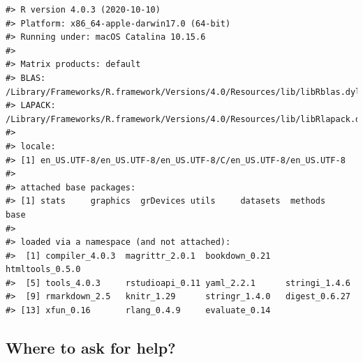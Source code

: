 \documentclass[
]{book}
\begin{document}
\begin{verbatim}
#> R version 4.0.3 (2020-10-10)
#> Platform: x86_64-apple-darwin17.0 (64-bit)
#> Running under: macOS Catalina 10.15.6
#> 
#> Matrix products: default
#> BLAS:   /Library/Frameworks/R.framework/Versions/4.0/Resources/lib/libRblas.dylib
#> LAPACK: /Library/Frameworks/R.framework/Versions/4.0/Resources/lib/libRlapack.dylib
#> 
#> locale:
#> [1] en_US.UTF-8/en_US.UTF-8/en_US.UTF-8/C/en_US.UTF-8/en_US.UTF-8
#> 
#> attached base packages:
#> [1] stats     graphics  grDevices utils     datasets  methods   base     
#> 
#> loaded via a namespace (and not attached):
#>  [1] compiler_4.0.3  magrittr_2.0.1  bookdown_0.21   htmltools_0.5.0
#>  [5] tools_4.0.3     rstudioapi_0.11 yaml_2.2.1      stringi_1.4.6  
#>  [9] rmarkdown_2.5   knitr_1.29      stringr_1.4.0   digest_0.6.27  
#> [13] xfun_0.16       rlang_0.4.9     evaluate_0.14
\end{verbatim}

\hypertarget{where-to-ask-for-help}{%
\subsection{Where to ask for help?}\label{where-to-ask-for-help}}
\end{document}

